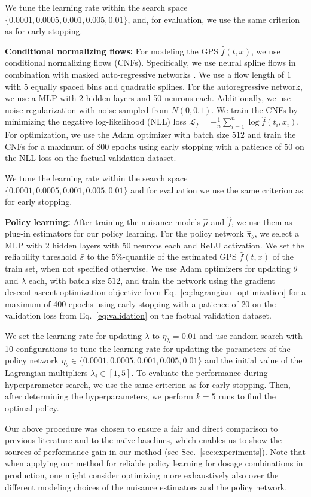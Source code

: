We tune the learning rate within the search space $\{0.0001, 0.0005, 0.001, 0.005, 0.01 \}$, and, for evaluation, we use the same criterion as for early stopping.

\textbf{Conditional normalizing flows:} For modeling the GPS $\hat{f}(t, x)$, we use conditional normalizing flows (CNFs). Specifically, we use neural spline flows \cite{durkan2019neural} in combination with masked auto-regressive networks \cite{dolatabadi2020invertible}. We use a flow length of $1$ with 5 equally spaced bins and quadratic splines. For the autoregressive network, we use a MLP with 2 hidden layers and 50 neurons each. Additionally, we use noise regularization with noise sampled from $N(0, 0.1)$. We train the CNFs by minimizing the negative log-likelihood (NLL) loss $ \mathcal{L}_{f}= - \frac{1}{n}\sum_{i=1}^n  \log  \hat{f}(t_i, x_i)$. For optimization, we use the Adam optimizer with batch size $512$ and train the CNFs for a maximum of 800 epochs using early stopping with a patience of $50$ on the NLL loss on the factual validation dataset. 

We tune the learning rate within the search space $\{0.0001, 0.0005, 0.001, 0.005, 0.01 \}$ and for evaluation we use the same criterion as for early stopping.

\textbf{Policy learning:} After training the nuisance models $\hat{\mu}$ and $\hat{f}$, we use them as plug-in estimators for our policy learning. For the policy network $\hat{\pi}_\theta$, we select a MLP with 2 hidden layers with 50 neurons each and ReLU activation. We set the reliability threshold $\Bar{\varepsilon}$ to the $5\%$-quantile of the estimated GPS $\hat{f}(t, x)$ of the train set, when not specified otherwise. We use Adam optimizers for updating $\theta$ and $\lambda$ each, with batch size $512$, and train the network using the gradient descent-ascent optimization objective from Eq.~\eqref{eq:lagrangian_optimization} for a maximum of 400 epochs using early stopping with a patience of $20$ on the validation loss from Eq.~\eqref{eq:validation} on the factual validation dataset.

We set the learning rate for updating $\lambda$ to $\eta_\lambda= 0.01$ and use random search with 10 configurations to tune the learning rate for updating the parameters of the policy network $\eta_\theta \in \{0.0001, 0.0005, 0.001, 0.005, 0.01 \}$ and the initial value of the Lagrangian multipliers $\lambda_i \in [1, 5]$. To evaluate the performance during hyperparameter search, we use the same criterion as for early stopping. Then, after determining the hyperparameters, we perform  $k=5$ runs to find the optimal policy.

Our above procedure was chosen to ensure a fair and direct comparison to previous literature and to the na\"ive baselines, which enables us to show the sources of performance gain in our method (see Sec.~\ref{sec:experiments}). Note that when applying our method for reliable policy learning for dosage combinations in production, one might consider optimizing more exhaustively also over the different modeling choices of the nuisance estimators and the policy network.

